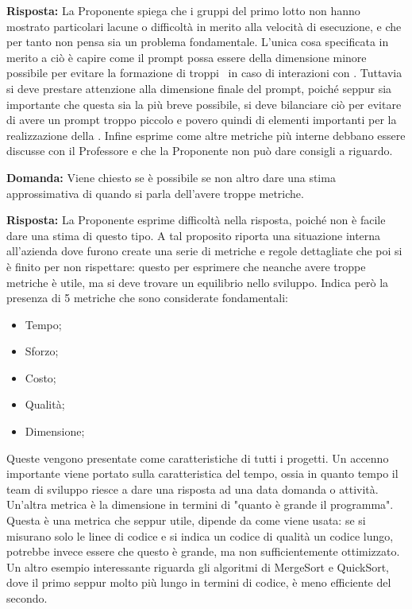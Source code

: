 \par \textbf{Risposta:} La Proponente spiega che i gruppi del primo lotto non hanno mostrato particolari lacune o difficoltà in merito alla velocità di esecuzione, e che per tanto non pensa sia un problema fondamentale.
L'unica cosa specificata in merito a ciò è capire come il prompt possa essere della dimensione minore possibile per evitare la formazione di troppi \ in caso di interazioni con .
Tuttavia si deve prestare attenzione alla dimensione finale del prompt, poiché seppur sia importante che questa sia la più breve possibile, si deve bilanciare ciò per evitare di avere un prompt troppo piccolo e povero quindi di elementi importanti per la realizzazione della .
Infine esprime come altre metriche più interne debbano essere discusse con il Professore e che la Proponente non può dare consigli a riguardo.

\par \textbf{Domanda:} Viene chiesto se è possibile se non altro dare una stima approssimativa di quando si parla dell'avere troppe metriche.

\par \textbf{Risposta:} La Proponente esprime difficoltà nella risposta, poiché non è facile dare una stima di questo tipo.
A tal proposito riporta una situazione interna all'azienda dove furono create una serie di metriche e regole dettagliate che poi si è finito per non rispettare: questo per esprimere che neanche avere troppe metriche è utile, ma si deve trovare un equilibrio nello sviluppo.
Indica però la presenza di 5 metriche che sono considerate fondamentali:
\begin{itemize}
	\item Tempo;
	\item Sforzo;
	\item Costo;
	\item Qualità;
	\item Dimensione;
\end{itemize}
Queste vengono presentate come caratteristiche di tutti i progetti.
Un accenno importante viene portato sulla caratteristica del tempo, ossia in quanto tempo il team di sviluppo riesce a dare una risposta ad una data domanda o attività.
Un'altra metrica è la dimensione in termini di "quanto è grande il programma". 
Questa è una metrica che seppur utile, dipende da come viene usata: se si misurano solo le linee di codice e si indica un codice di qualità un codice lungo, potrebbe invece essere che questo è grande, ma non sufficientemente ottimizzato. 
Un altro esempio interessante riguarda gli algoritmi di MergeSort e QuickSort, dove il primo seppur molto più lungo in termini di codice, è meno efficiente del secondo.

